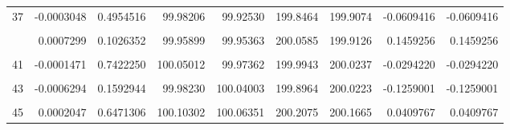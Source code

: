 \documentclass[a4paper]{tufte-handout}
\begin{document}
\begin{table}
{\begin{tabular}[t]{rrrrrrrrr}
37 & -0.0003048 & 0.4954516 & 99.98206 & 99.92530 & 199.8464 & 199.9074 & -0.0609416 & -0.0609416\\
\cellcolor{gray!6}{38} & \cellcolor{gray!6}{0.0001726} & \cellcolor{gray!6}{0.6995903} & \cellcolor{gray!6}{100.01911} & \cellcolor{gray!6}{99.99586} & \cellcolor{gray!6}{200.0495} & \cellcolor{gray!6}{200.0150} & \cellcolor{gray!6}{0.0345162} & \cellcolor{gray!6}{0.0345162}\\
\addlinespace
39 & 0.0007299 & 0.1026352 & 99.95899 & 99.95363 & 200.0585 & 199.9126 & 0.1459256 & 0.1459256\\
\cellcolor{gray!6}{40} & \cellcolor{gray!6}{-0.0002076} & \cellcolor{gray!6}{0.6425365} & \cellcolor{gray!6}{100.01073} & \cellcolor{gray!6}{99.93473} & \cellcolor{gray!6}{199.9040} & \cellcolor{gray!6}{199.9455} & \cellcolor{gray!6}{-0.0415040} & \cellcolor{gray!6}{-0.0415040}\\
41 & -0.0001471 & 0.7422250 & 100.05012 & 99.97362 & 199.9943 & 200.0237 & -0.0294220 & -0.0294220\\
\cellcolor{gray!6}{42} & \cellcolor{gray!6}{0.0001196} & \cellcolor{gray!6}{0.7892026} & \cellcolor{gray!6}{99.91426} & \cellcolor{gray!6}{99.99920} & \cellcolor{gray!6}{199.9374} & \cellcolor{gray!6}{199.9135} & \cellcolor{gray!6}{0.0239018} & \cellcolor{gray!6}{0.0239018}\\
43 & -0.0006294 & 0.1592944 & 99.98230 & 100.04003 & 199.8964 & 200.0223 & -0.1259001 & -0.1259001\\
\addlinespace
\cellcolor{gray!6}{44} & \cellcolor{gray!6}{-0.0005545} & \cellcolor{gray!6}{0.2150104} & \cellcolor{gray!6}{99.96039} & \cellcolor{gray!6}{100.02832} & \cellcolor{gray!6}{199.8778} & \cellcolor{gray!6}{199.9887} & \cellcolor{gray!6}{-0.1108943} & \cellcolor{gray!6}{-0.1108943}\\
45 & 0.0002047 & 0.6471306 & 100.10302 & 100.06351 & 200.2075 & 200.1665 & 0.0409767 & 0.0409767\\
\bottomrule
\end{tabular}}
\end{table}
\end{document}
